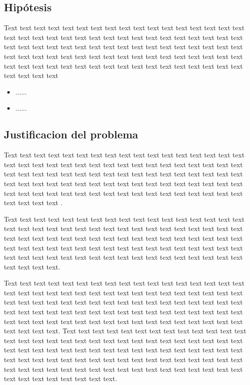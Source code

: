 \documentclass[12pt,a4paper]{article}
\begin{document}
\subsection{Hipótesis}
\label{sec:2a}
Text text text text text text text text text text text text text text text text text text text text text text text text text text text text text text text text text text text text text text text text text text text text text text text text text text text text text text text text text text text text text text text text text text text text text text text text text text text text text text text text text text text text text text text text text


\begin{itemize}
  \item ......
  \item ......
\end{itemize}
\subsection{Justificacion del problema}\label{sec:3}
Text text text text text text text text text text text text text text text text text text text text text text text text text text text text text text text text text text text text text text text text text text text text text text text text text text text text text text text text text text text text text text text text text text text text text text text text text text text text text text text text text text text text text text text text text \cite{Garcia2023}.

Text text text text text text text text text text text text text text text text text text text text text text text text text text text text text text text text text text text text text text text text text text text text text text text text text text text text text text text text text text text text text text text text text text text text text text text text text text text text text text text text text text text text text text text text text.

Text text text text text text text text text text text text text text text text text text text text text text text text text text text text text text text text text text text text text text text text text text text text text text text text text text text text text text text text text text text text text text text text text text text text text text text text text text text text text text text text text text text text text text text text text.
Text text text text text text text text text text text text text text text text text text text text text text text text text text text text text text text text text text text text text text text text text text text text text text text text text text text text text text text text text text text text text text text text text text text text text text text text text text text text text text text text text text text text text text text text text.
\end{document}
